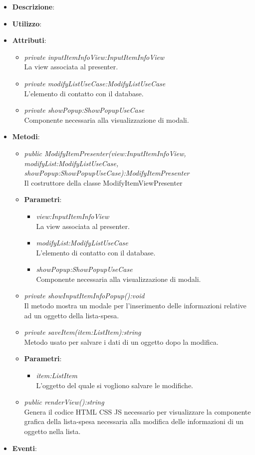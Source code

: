 \begin{itemize}
\item \textbf{Descrizione}: 
\item \textbf{Utilizzo}:
\item \textbf{Attributi}: 
	\begin{itemize}
	\item \textit{private inputItemInfoView:InputItemInfoView}\\
	La view associata al presenter.
	\item \textit{private modifyListUseCase:ModifyListUseCase}\\
	L'elemento di contatto con il database.
	\item \textit{private showPopup:ShowPopupUseCase}\\
	Componente necessaria alla visualizzazione di modali.
	\end{itemize}
\item \textbf{Metodi}:
	\begin{itemize}
	\item \textit{public ModifyItemPresenter(view:InputItemInfoView, modifyList:ModifyListUseCase, showPopup:ShowPopupUseCase):ModifyItemPresenter}\\
	Il costruttore della classe ModifyItemViewPresenter
		\item{\textbf{Parametri}: \begin{itemize}
		\item \textit{view:InputItemInfoView}\\
		La view associata al presenter.
		\item \textit{modifyList:ModifyListUseCase}\\
		L'elemento di contatto con il database.
		\item \textit{showPopup:ShowPopupUseCase}\\
		Componente necessaria alla visualizzazione di modali.
		\end{itemize}}
	\item \textit{private showInputItemInfoPopup():void}\\
	Il metodo mostra un modale per l'inserimento delle informazioni relative ad un oggetto della lista-spesa.
	\item \textit{private saveItem(item:ListItem):string}\\
	Metodo usato per salvare i dati di un oggetto dopo la modifica.
			\item{\textbf{Parametri}: \begin{itemize}
			\item \textit{item:ListItem}\\
			L'oggetto del quale si vogliono salvare le modifiche.
			\end{itemize}}
	\item \textit{public renderView():string}\\
		Genera il codice HTML CSS JS necessario per visualizzare la componente grafica della lista-spesa necessaria alla modifica delle informazioni di un oggetto nella lista.
	\end{itemize}
\item \textbf{Eventi}:
\end{itemize}